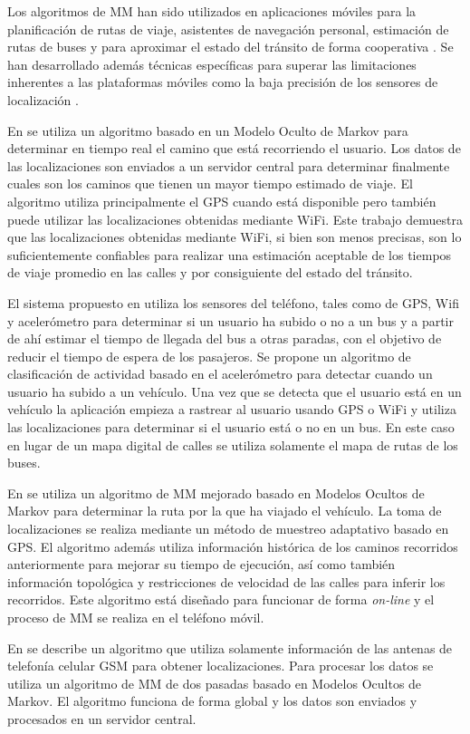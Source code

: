 Los algoritmos de MM han sido utilizados en aplicaciones móviles para la planificación de rutas de viaje, asistentes de navegación personal, estimación de rutas de buses y para aproximar el estado del tránsito de forma cooperativa \cite{thiagarajan2010cooperative, thiagarajan2009vtrack}. Se han desarrollado además técnicas específicas para superar las limitaciones inherentes a las plataformas móviles como la baja precisión de los sensores de localización  \cite{thiagarajan2011accurate, fang2011enacq}.

En \cite{thiagarajan2009vtrack} se utiliza un algoritmo basado en un Modelo Oculto de Markov para determinar en tiempo real el camino que está recorriendo el usuario. Los datos de las localizaciones son enviados a un servidor central para determinar finalmente cuales son los caminos que tienen un mayor tiempo estimado de viaje. El algoritmo utiliza principalmente el GPS cuando está disponible pero también puede utilizar las localizaciones obtenidas mediante WiFi. Este trabajo demuestra que las localizaciones obtenidas mediante WiFi, si bien son menos precisas, son lo suficientemente confiables para realizar una estimación aceptable de los tiempos de viaje promedio en las calles y por consiguiente del estado del tránsito.

El sistema propuesto en \cite{thiagarajan2010cooperative} utiliza los sensores del teléfono, tales como de GPS, Wifi y acelerómetro para determinar si un usuario ha subido o no a un bus y a partir de ahí estimar el tiempo de llegada del bus a otras paradas, con el objetivo de reducir el tiempo de espera de los pasajeros. Se propone un algoritmo de clasificación de actividad basado en el acelerómetro para detectar cuando un usuario ha subido a un vehículo. Una vez que se detecta que el usuario está en un vehículo la aplicación empieza a rastrear al usuario usando GPS o WiFi y utiliza las localizaciones para determinar si el usuario está o no en un bus. En este caso en lugar de un mapa digital de calles se utiliza solamente el mapa de rutas de los buses. %

En \cite{fang2011enacq} se utiliza un algoritmo de MM mejorado basado en Modelos Ocultos de Markov para determinar la ruta por la que ha viajado el vehículo. La toma de localizaciones se realiza mediante un método de muestreo adaptativo basado en GPS. El algoritmo además utiliza información histórica de los caminos recorridos anteriormente  para mejorar su tiempo de ejecución, así como también información topológica y restricciones de velocidad de las calles para inferir los recorridos. Este algoritmo está diseñado para funcionar de forma \emph{on-line} y el proceso de MM se realiza en el teléfono móvil.

En \cite{thiagarajan2011accurate} se describe un algoritmo que utiliza solamente información de las antenas de telefonía celular GSM para obtener localizaciones. Para procesar los datos se utiliza un algoritmo de MM de dos pasadas basado en Modelos Ocultos de Markov. El algoritmo funciona de forma global y los datos son enviados y procesados en un servidor central.
